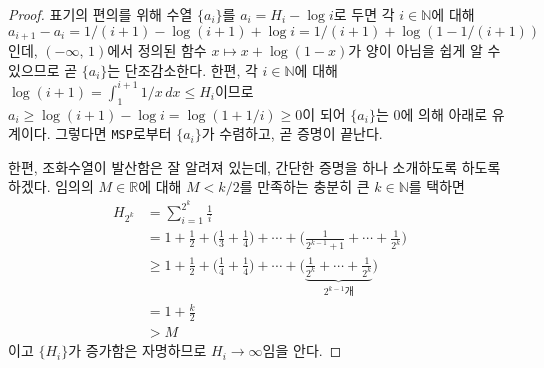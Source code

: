 \begin{proof}
    표기의 편의를 위해 수열 $\{a_i\}$를 $a_i=H_i-\log i$로 두면 각 $i\in\mathbb{N}$에 대해 $a_{i+1}-a_i=1/(i+1)-\log(i+1)+\log i=1/(i+1)+\log(1-1/(i+1))$인데, $(-\infty,\,1)$에서 정의된 함수 $x\mapsto x+\log(1-x)$가 양이 아님을 쉽게 알 수 있으므로 곧 $\{a_i\}$는 단조감소한다. 한편, 각 $i\in\mathbb{N}$에 대해 $\log(i+1)=\int_1^{i+1}1/x\,dx\leq H_i$이므로 $a_i\geq\log(i+1)-\log i=\log(1+1/i)\geq0$이 되어 $\{a_i\}$는 $0$에 의해 아래로 유계이다. 그렇다면 \texttt{MSP}로부터 $\{a_i\}$가 수렴하고, 곧 증명이 끝난다.
    
    한편, 조화수열이 발산함은 잘 알려져 있는데, 간단한 증명을 하나 소개하도록 하도록 하겠다. 임의의 $M\in\mathbb{R}$에 대해 $M<k/2$를 만족하는 충분히 큰 $k\in\mathbb{N}$를 택하면
    \begin{align*}
        H_{2^k}&=\sum_{i=1}^{2^k}\frac{1}{i}\\
        &=1+\frac{1}{2}+\bigg(\frac{1}{3}+\frac{1}{4}\bigg)+\cdots+\bigg(\frac{1}{2^{k-1}+1}+\cdots+\frac{1}{2^{k}}\bigg)\\
        &\geq1+\frac{1}{2}+\bigg(\frac{1}{4}+\frac{1}{4}\bigg)+\cdots+\bigg(\underbrace{\frac{1}{2^k}+\cdots+\frac{1}{2^k}}_{2^{k-1}\textrm{개}}\bigg)\\
        &=1+\frac{k}{2}\\
        &>M
    \end{align*}
    이고 $\{H_i\}$가 증가함은 자명하므로 $H_i\to\infty$임을 안다.
\end{proof}

